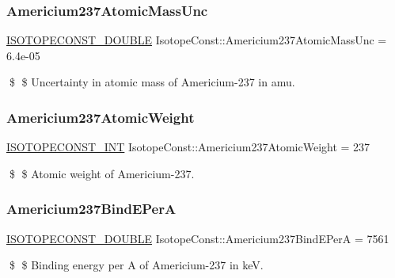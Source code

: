 \subsubsection{\texorpdfstring{Americium237\+Atomic\+Mass\+Unc}{Americium237AtomicMassUnc}}
{\footnotesize\ttfamily \mbox{\hyperlink{group___isotope_const-_macros_ga8f45a7272ce02c0b4c65c44636ed719a}{I\+S\+O\+T\+O\+P\+E\+C\+O\+N\+S\+T\+\_\+\+D\+O\+U\+B\+LE}} Isotope\+Const\+::\+Americium237\+Atomic\+Mass\+Unc = 6.\+4e-\/05}

\$ \$ Uncertainty in atomic mass of Americium-\/237 in amu. \mbox{\label{group___isotope_const-_americium-_am237_ga9adf6486929f7d48353cfe5574123081}} 
\subsubsection{\texorpdfstring{Americium237\+Atomic\+Weight}{Americium237AtomicWeight}}
{\footnotesize\ttfamily \mbox{\hyperlink{group___isotope_const-_macros_ga5f18360b3e99483a35c32d789e62621c}{I\+S\+O\+T\+O\+P\+E\+C\+O\+N\+S\+T\+\_\+\+I\+NT}} Isotope\+Const\+::\+Americium237\+Atomic\+Weight = 237}

\$ \$ Atomic weight of Americium-\/237. \mbox{\label{group___isotope_const-_americium-_am237_gab071f740d50faf4e53060b875ae22001}} 
\subsubsection{\texorpdfstring{Americium237\+Bind\+E\+PerA}{Americium237BindEPerA}}
{\footnotesize\ttfamily \mbox{\hyperlink{group___isotope_const-_macros_ga8f45a7272ce02c0b4c65c44636ed719a}{I\+S\+O\+T\+O\+P\+E\+C\+O\+N\+S\+T\+\_\+\+D\+O\+U\+B\+LE}} Isotope\+Const\+::\+Americium237\+Bind\+E\+PerA = 7561}

\$ \$ Binding energy per A of Americium-\/237 in keV. \mbox{\label{group___isotope_const-_americium-_am237_gad4f748e302d0f0ad59d52d0f123be240}} 
